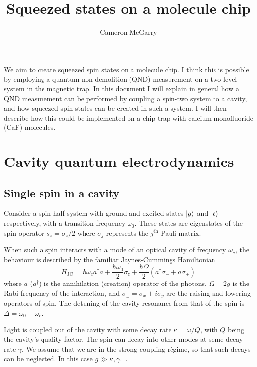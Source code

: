 \documentclass{article}
\title{Squeezed states on a molecule chip}
\author{Cameron McGarry}
\begin{document}
\maketitle

We aim to create squeezed spin states on a molecule chip. I think this is
possible by employing a quantum non-demolition (QND) measurement on a two-level
system in the magnetic trap. In this document I will explain in general how
a QND measurement can be performed by coupling a spin-two system to a cavity,
and how squeezed spin states can be created in such a system. I will then
describe how this could be implemented on a chip trap with calcium monofluoride
(CaF) molecules.

\section{Cavity quantum electrodynamics}

\subsection{Single spin in a cavity}

Consider a spin-half system with ground and excited states $\ket{g}$
and $\ket{e}$ respectively, with a transition frequency $\omega_0$. These
states are eigenstates of the spin operator $s_z = \sigma_z /2$ where
$\sigma_j$ represents the $j^\text{th}$ Pauli matrix.

When such a spin interacts with a mode of an optical cavity of frequency
$\omega_c$, the behaviour is described by the familiar Jaynes-Cummings
Hamiltonian~\cite{}
%
\begin{equation}
  H_\text{JC} = \hbar\omega_c a^\dagger a + \frac{\hbar \omega_0}{2}\sigma_z +
  \frac{\hbar\Omega}{2}(a^\dagger \sigma_- + a\sigma_+)
  \label{JCH}
\end{equation}
%
where $a$ ($a^\dagger$) is the annihilation (creation) operator of the photons,
$\Omega = 2g$ is the Rabi frequency of the interaction, and $\sigma_\pm =
\sigma_x \pm i\sigma_y$ are the raising and lowering operators of spin. The
detuning of the cavity resonance from that of the spin is $\Delta = \omega_0 -
\omega_c$.

Light is coupled out of the cavity with some decay rate $\kappa = \omega/Q$,
with $Q$ being the cavity's quality factor. The spin can decay into other modes
at some decay rate $\gamma$. We assume that we are in the strong coupling
r\'egime, so that such decays can be neglected. In this case $g \gg \kappa,
\gamma$.~\cite{PhysRevA.69.062320}.
\end{document}
